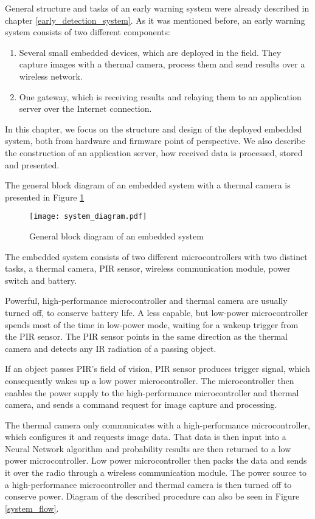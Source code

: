 General structure and tasks of an early warning system were already described in chapter \ref{early_detection_system}.
As it was mentioned before, an early warning system consists of two different components:

\begin{enumerate} 
    \item Several small embedded devices, which are deployed in the field. They capture images with a thermal camera, process them and send results over a wireless network.
    \item One gateway, which is receiving results and relaying them to an application server over the Internet connection.
\end{enumerate} 

In this chapter, we focus on the structure and design of the deployed embedded system, both from hardware and firmware point of perspective.
We also describe the construction of an application server, how received data is processed, stored and presented.

The general block diagram of an embedded system with a thermal camera is presented in Figure \ref{system_diagram} 

\begin{figure}[ht]
        \centering
        \texttt{[image: system\_diagram.pdf]} 
        \caption{ General block diagram of an embedded system}
        \label{system_diagram}
\end{figure}

The embedded system consists of two different microcontrollers with two distinct tasks, a thermal camera, PIR sensor, wireless communication module, power switch and battery.

Powerful, high-performance microcontroller and thermal camera are usually turned off, to conserve battery life.
A less capable, but low-power microcontroller spends most of the time in low-power mode, waiting for a wakeup trigger from the PIR sensor.
The PIR sensor points in the same direction as the thermal camera and detects any IR radiation of a passing object.

If an object passes PIR's field of vision, PIR sensor produces trigger signal, which consequently wakes up a low power microcontroller.
The microcontroller then enables the power supply to the high-performance microcontroller and thermal camera, and sends a command request for image capture and processing.

The thermal camera only communicates with a high-performance microcontroller, which configures it and requests image data.
That data is then input into a Neural Network algorithm and probability results are then returned to a low power microcontroller.
Low power microcontroller then packs the data and sends it over the radio through a wireless communication module.
The power source to a high-performance microcontroller and thermal camera is then turned off to conserve power.
Diagram of the described procedure can also be seen in Figure \ref{system_flow}.

